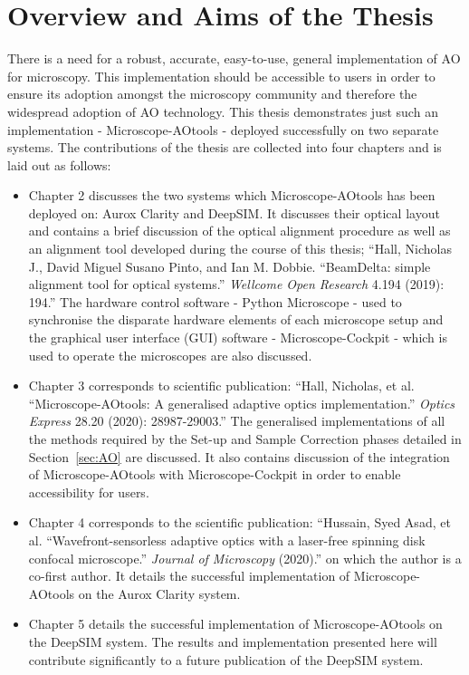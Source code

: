 \section{Overview and Aims of the Thesis}
\label{sec:overview}

There is a need for a robust, accurate, easy-to-use, general implementation 
of AO for microscopy\cite{ji2017adaptive,rodriguez2018adaptive}.
This implementation should be accessible to users in order to ensure its
adoption amongst the microscopy community and therefore the widespread 
adoption of AO technology. This thesis demonstrates just such an 
implementation - Microscope-AOtools - deployed successfully on two separate 
systems. The contributions of the thesis are collected into four chapters 
and is laid out as follows:

\begin{itemize}
	\item Chapter 2 discusses the two systems which Microscope-AOtools has
	been deployed on: Aurox Clarity and DeepSIM. It discusses their optical 
	layout and contains a brief discussion of the optical alignment 
	procedure as well as an alignment tool developed during the course of 
	this thesis; ``Hall, Nicholas J., David Miguel Susano Pinto, and Ian M. 
	Dobbie. ``BeamDelta: simple alignment tool for optical systems.'' 
	\textit{Wellcome Open Research} 4.194 (2019): 194.''\cite{dobbie2019beamdelta} 
	The hardware control software - Python Microscope\cite{pinto2021python} - used to synchronise 
	the disparate hardware elements of each microscope setup and the 
	graphical user interface (GUI) software - Microscope-Cockpit\cite{phillips2021microscope} - which 
	is used to operate the microscopes are also discussed.
	\item Chapter 3 corresponds to scientific publication: ``Hall, Nicholas, 
	et al. ``Microscope-AOtools: A generalised adaptive optics 
	implementation.''
	\textit{Optics Express} 28.20 (2020): 28987-29003.''\cite{hall2020microscope}
	The generalised implementations of all the methods required by the Set-up and 
	Sample Correction phases detailed in Section~\ref{sec:AO} are discussed.
	It also contains discussion of the integration of Microscope-AOtools with
	Microscope-Cockpit in order to enable accessibility for users.
	\item Chapter 4 corresponds to the scientific publication: ``Hussain, 
	Syed Asad, et al. ``Wavefront-sensorless adaptive optics with a 
	laser-free spinning disk confocal microscope.'' \textit{Journal of 
		Microscopy} (2020).'' 
	on which the author is a co-first author\cite{hussain2020wavefront}. It details the successful 
	implementation of Microscope-AOtools on the Aurox Clarity system.
	\item Chapter 5 details the successful implementation of Microscope-AOtools 
	on the DeepSIM system. The results and implementation presented here will
	contribute significantly to a future publication of the DeepSIM system.
\end{itemize}

